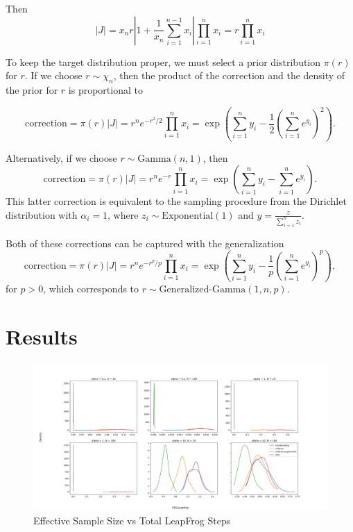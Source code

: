 \documentclass[11pt]{article}
\begin{document}
Then
\[
  |J| = x_n r \left|1 + \frac{1}{x_n}\sum_{i=1}^{n-1} x_i\right|
  \prod_{i=1}^n x_i = r \prod_{i=1}^n x_i
\]

To keep the target distribution proper, we must select a prior
distribution $\pi(r)$ for $r$.  If we choose $r \sim \chi_n$, then the
product of the correction and the density of the prior for $r$ is
proportional to

\[
  \mathrm{correction}
  = \pi(r) |J| = r^n e^{-r^2/2} \prod_{i=1}^n x_i
  = \exp\left(\sum_{i=1}^n y_i - \frac{1}{2}\left(\sum_{i=1}^n
      e^{y_i}\right)^2\right).
\]

Alternatively, if we choose $r \sim \mathrm{Gamma}(n, 1)$, then
\[
  \mathrm{correction} = \pi(r) |J| = r^n e^{-r} \prod_{i=1}^n x_i =
  \exp\left(\sum_{i=1}^n y_i - \sum_{i=1}^n e^{y_i}\right).
\]
This latter correction is equivalent to the sampling procedure from
the Dirichlet distribution with $\alpha_i=1$, where
$z_i \sim \mathrm{Exponential}(1)$ and
$y = \frac{z}{\sum_{i=1}^n z_i}$.

Both of these corrections can be captured with the generalization
\[
  \mathrm{correction}
  = \pi(r) |J|
  = r^n e^{-r^p/p} \prod_{i=1}^n x_i
  = \exp\left(\sum_{i=1}^n y_i - \frac{1}{p} \left(\sum_{i=1}^n e^{y_i}\right)^p\right),
\]
for $p > 0$, which corresponds to $r \sim \text{Generalized-Gamma}(1, n, p)$.

\section{Results}

\begin{figure}
    \centering
    \includegraphics[width=1.2\textwidth]{figures/ess.png}
    \caption{Effective Sample Size vs Total LeapFrog Steps}
    \label{fig:ess}
\end{figure}
\end{document}
